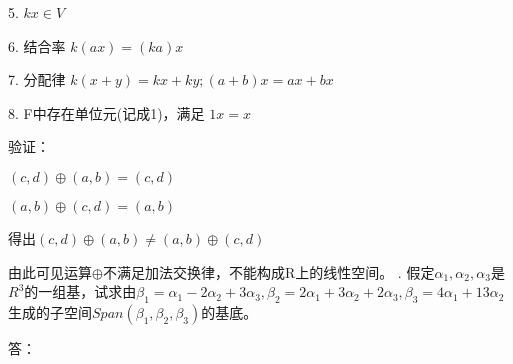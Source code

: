 \documentclass[a4paper, 12pt]{article}
\begin{document}
5. \begin{math}kx\in V\end{math}
	
6. 结合率 \begin{math}k(ax) = (ka)x\end{math}
	
7. 分配律 \begin{math}k(x + y) = kx + ky; (a + b)x = ax + bx\end{math}
	
8. F中存在单位元(记成1)，满足
\begin{math}1x = x\end{math}
		
验证：

\begin{math}(c, d)\oplus(a, b) = (c, d)\end{math}

\begin{math}(a, b)\oplus(c, d) = (a, b)\end{math}

得出\begin{math}(c, d)\oplus(a, b)\neq(a, b)\oplus(c, d)\end{math}

由此可见运算\begin{math}\oplus\end{math}不满足加法交换律，不能构成R上的线性空间。
. 假定\begin{math}\alpha_{1}, \alpha_{2}, \alpha_{3}\end{math}是\begin{math}R^{3}\end{math}的一组基，试求由\begin{math}\beta_{1} = \alpha_{1} - 2\alpha_{2} + 3\alpha_{3}, \beta_{2} = 2\alpha_{1} + 3\alpha_{2} + 2\alpha_{3}, \beta_{3} =4 \alpha_{1} + 13\alpha_{2}\end{math}生成的子空间\begin{math}Span(\beta_{1}, \beta_{2}, \beta_{3})\end{math}的基底。

答：
\end{document}
